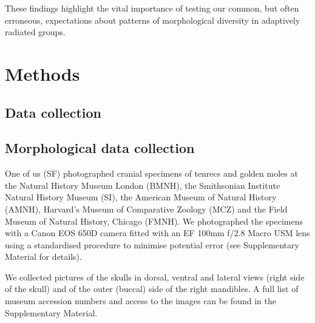 \documentclass[12pt,a4paper]{article}
\begin{document}
These findings highlight the vital importance of testing our common, but often erroneous, expectations about patterns of morphological diversity in adaptively radiated groups. 


\section{Methods}

\subsection{Data collection} %

\subsection{Morphological data collection} %

	
One of us (SF) photographed cranial specimens of tenrecs and golden moles at the Natural History Museum London (BMNH), the Smithsonian Institute Natural History Museum (SI), the American Museum of Natural History (AMNH), Harvard's Museum of Comparative Zoology (MCZ) and the Field Museum of Natural History, Chicago (FMNH). We photographed the specimens with a Canon EOS 650D camera fitted with an EF 100mm f/2.8 Macro USM lens using a standardised procedure to minimise potential error (see Supplementary Material for details). 


We collected pictures of the skulls in dorsal, ventral and lateral views (right side of the skull) and of the outer (buccal) side of the right mandibles. A full list of museum accession numbers and access to the images can be found in the Supplementary Material.
\end{document}
